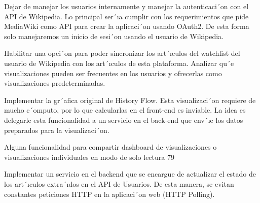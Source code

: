\begin{list}{}{}
    \item Dejar de manejar los usuarios internamente y manejar la autenticaci´on
          con el API de Wikipedia. Lo principal ser´ıa cumplir con los requerimientos que pide MediaWiki como API para crear la aplicaci´on usando
          OAuth2. De esta forma solo manejaremos un inicio de sesi´on usando el
          usuario de Wikipedia.
    \item Habilitar una opci´on para poder sincronizar los art´ıculos del watchlist
          del usuario de Wikipedia con los art´ıculos de esta plataforma.
          Analizar qu´e visualizaciones pueden ser frecuentes en los usuarios y
          ofrecerlas como visualizaciones predeterminadas.
    \item Implementar la gr´afica original de History Flow. Esta visualizaci´on requiere de mucho c´omputo, por lo que calcularlas en el front-end es
          inviable. La idea es delegarle esta funcionalidad a un servicio en el
          back-end que env´ıe los datos preparados para la visualizaci´on.
    \item Alguna funcionalidad para compartir dashboard de visualizaciones o
          visualizaciones individuales en modo de solo lectura
          79
    \item Implementar un servicio en el backend que se encargue de actualizar
          el estado de los art´ıculos extra´ıdos en el API de Usuarios. De esta
          manera, se evitan constantes peticiones HTTP en la aplicaci´on web
          (HTTP Polling).
\end{list}
